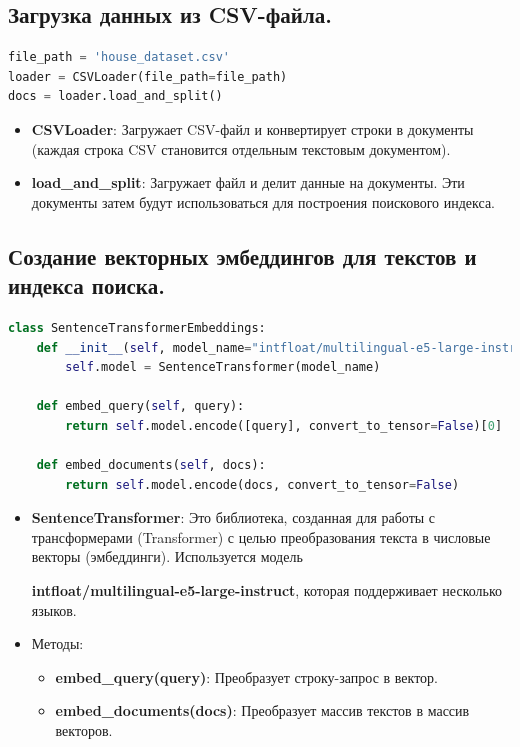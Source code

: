 \documentclass{article}
\begin{document}
\subsection{Загрузка данных из CSV-файла.}

\begin{lstlisting}[language=Python, label=code:example]
file_path = 'house_dataset.csv'
loader = CSVLoader(file_path=file_path)
docs = loader.load_and_split()
\end{lstlisting}

\begin{itemize}
    \item \textbf{CSVLoader}: Загружает CSV-файл и конвертирует строки в документы (каждая строка CSV становится отдельным текстовым документом).
    \item \textbf{load\_and\_split}: Загружает файл и делит данные на документы. Эти документы затем будут использоваться для построения поискового индекса.
\end{itemize}

\subsection{Создание векторных эмбеддингов для текстов и индекса поиска.}

\begin{lstlisting}[language=Python, label=code:example]
class SentenceTransformerEmbeddings:
    def __init__(self, model_name="intfloat/multilingual-e5-large-instruct"):
        self.model = SentenceTransformer(model_name)

    def embed_query(self, query):
        return self.model.encode([query], convert_to_tensor=False)[0]

    def embed_documents(self, docs):
        return self.model.encode(docs, convert_to_tensor=False)
\end{lstlisting}

\begin{itemize}
    \item \textbf{SentenceTransformer}: Это библиотека, созданная для работы с трансформерами (Transformer)  с целью преобразования текста в числовые векторы (эмбеддинги). Используется модель
    
    \textbf{intfloat/multilingual-e5-large-instruct}, которая поддерживает несколько языков.
    \item Методы:
    \begin{itemize}
        \item \textbf{embed\_query(query)}: Преобразует строку-запрос в вектор.
        \item \textbf{embed\_documents(docs)}: Преобразует массив текстов в массив векторов.
    \end{itemize}
\end{itemize}
\end{document}
